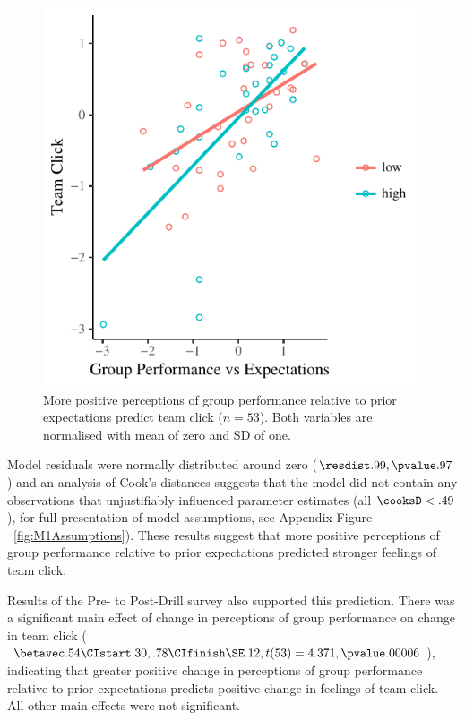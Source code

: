 \begin{figure}
    \centering
    \includegraphics[width=0.5\linewidth,keepaspectratio] {images/teamPerfExpClickScatter-1}
    \caption{More positive perceptions of group performance relative to prior expectations predict team click ($n = 53$).  Both  variables are normalised with mean of zero and SD of one.}
    \label{fig:teamPerfExpClickScatter}
\end{figure}

Model residuals were normally distributed around zero ($\resdist .99, \pvalue .97 $) and an analysis of Cook's distances suggests that the model did not contain any observations that unjustifiably influenced parameter estimates (all $\cooksD < .49$), for full presentation of model assumptions, see Appendix Figure ~\ref{fig:M1Assumptions}).  These results suggest that more positive perceptions of group performance relative to prior expectations predicted stronger feelings of team click.


Results of the Pre- to Post-Drill survey also supported this prediction.  There was a significant main effect of change in perceptions of group performance on change in team click ($\betavec .54 \CIstart .30, .78 \CIfinish \SE .12, t(53) = 4.371, \pvalue .00006$), indicating that greater positive change in perceptions of group performance relative to prior expectations predicts positive change in feelings of team click.  All other main effects were not significant.

